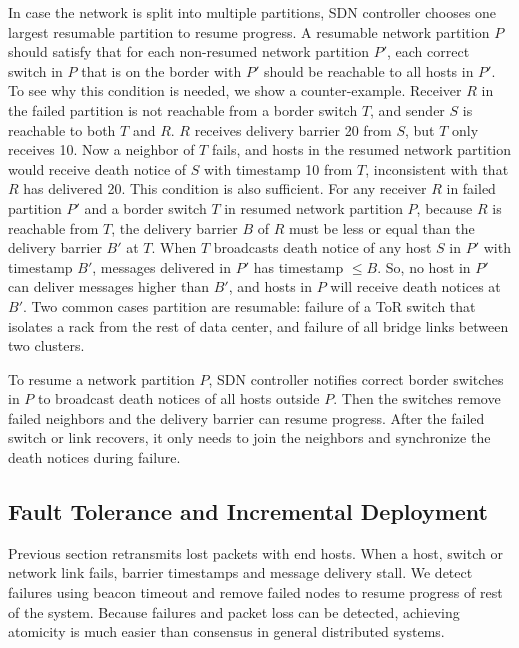 {In case the network is split into multiple partitions, SDN controller chooses one largest resumable partition to resume progress.
A resumable network partition $P$ should satisfy that for each non-resumed network partition $P'$, each correct switch in $P$ that is on the border with $P'$ should be reachable to all hosts in $P'$.
To see why this condition is needed, we show a counter-example.
Receiver $R$ in the failed partition is not reachable from a border switch $T$, and sender $S$ is reachable to both $T$ and $R$.
$R$ receives delivery barrier 20 from $S$, but $T$ only receives 10.
Now a neighbor of $T$ fails, and hosts in the resumed network partition would receive death notice of $S$ with timestamp 10 from $T$, inconsistent with that $R$ has delivered 20.
This condition is also sufficient.
For any receiver $R$ in failed partition $P'$ and a border switch $T$ in resumed network partition $P$, because $R$ is reachable from $T$, the delivery barrier $B$ of $R$ must be less or equal than the delivery barrier $B'$ at $T$.
When $T$ broadcasts death notice of any host $S$ in $P'$ with timestamp $B'$, messages delivered in $P'$ has timestamp $\le B$.
So, no host in $P'$ can deliver messages higher than $B'$, and hosts in $P$ will receive death notices at $B'$.
Two common cases  partition are resumable: failure of a ToR switch that isolates a rack from the rest of data center, and failure of all bridge links between two clusters.

To resume a network partition $P$, SDN controller notifies correct border switches in $P$ to broadcast death notices of all hosts outside $P$.
Then the switches remove failed neighbors and the delivery barrier can resume progress.
After the failed switch or link recovers, it only needs to join the neighbors and synchronize the death notices during failure.



\iffalse
\subsection{Fault Tolerance and Incremental Deployment}
\label{sec:failure}

Previous section retransmits lost packets with end hosts.
When a host, switch or network link fails, barrier timestamps and message delivery stall.
We detect failures using beacon timeout and remove failed nodes to resume progress of rest of the system.
Because failures and packet loss can be detected, achieving atomicity is much easier than consensus in general distributed systems.

}
